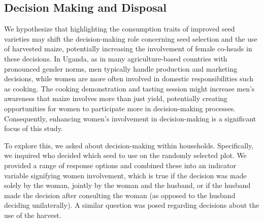 \documentclass[english]{article}\usepackage[]{graphicx}\usepackage[]{xcolor}
\begin{document}
\subsection{Decision Making and Disposal}

We hypothesize that highlighting the consumption traits of improved
seed varieties may shift the decision-making role concerning seed
selection and the use of harvested maize, potentially increasing the
involvement of female co-heads in these decisions. In Uganda, as in
many agriculture-based countries with pronounced gender norms, men
typically handle production and marketing decisions, while women are
more often involved in domestic responsibilities such as cooking.
The cooking demonstration and tasting session might increase men's
awareness that maize involves more than just yield, potentially creating
opportunities for women to participate more in decision-making processes.
Consequently, enhancing women's involvement in decision-making is
a significant focus of this study.

To explore this, we asked about decision-making within households.
Specifically, we inquired who decided which seed to use on the randomly
selected plot. We provided a range of response options and combined
these into an indicator variable signifying women involvement, which
is true if the decision was made solely by the woman, jointly by the
woman and the husband, or if the husband made the decision after consulting
the woman (as opposed to the husband deciding unilaterally). A similar
question was posed regarding decisions about the use of the harvest. 
\end{document}
